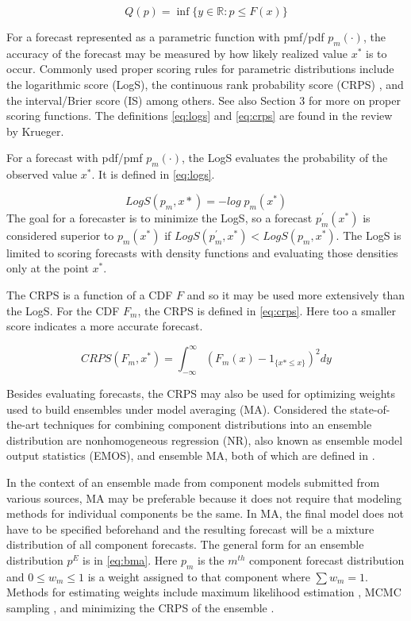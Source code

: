 \documentclass[11pt,notitlepage]{isuthesis}
\begin{document}
\begin{equation}
\label{eq:quant}
  Q(p) = \inf \{ y \in \mathbb{R} : p \leq F(x) \}
\end{equation}



For a forecast represented as a parametric function with pmf/pdf $p_m(\cdot)$, 
the accuracy of the forecast may be measured by how likely realized value $x^*$
is to occur. Commonly used proper scoring rules for parametric distributions
include the logarithmic score (LogS), the
continuous rank probability score (CRPS) \cite[]{hersbach2000decomposition}
\cite[]{alves2013ncep}, and the interval/Brier 
score (IS) \cite[]{gneiting2007strictly} among 
others. See also \cite[]{gneiting2014probabilistic}
Section 3 for more on proper scoring functions. The definitions 
\eqref{eq:logs} and \eqref{eq:crps} are found in the review by Krueger.

For a forecast with pdf/pmf $p_m(\cdot)$, the LogS evaluates the 
probability of the observed value $x^*$. It is defined in \eqref{eq:logs}.

\begin{equation}
\label{eq:logs}
  LogS(p_m,x*) = -log\;p_m(x^*)
\end{equation}
The goal for a forecaster is to minimize the LogS, so a forecast $p^{'}_m(x^*)$ 
is considered 
superior to $p_m(x^*)$ if
$LogS(p^{'}_m, x^*) < LogS(p_m, x^*)$.
The LogS is limited to scoring forecasts with density functions and
evaluating those densities only at the point $x^*$.

The CRPS is a function of a CDF $F$
and so it may
be used more extensively than the LogS. 
For the CDF $F_m$, the CRPS is defined in \eqref{eq:crps}.
Here too a smaller score indicates a more accurate forecast.

\begin{equation}
\label{eq:crps}
  CRPS(F_m, x^*) = \int_{-\infty}^{\infty} (F_m(x)- 1_{\{x*\leq x\}})^2 dy
\end{equation}


Besides evaluating forecasts, the CRPS may also be used for optimizing weights 
used
to build ensembles under model averaging (MA). Considered the 
state-of-the-art techniques for combining 
component distributions
into an ensemble distribution are nonhomogeneous regression (NR), also known as
ensemble model output statistics (EMOS), and ensemble
MA, both of which are defined in \cite[]{gneiting2014probabilistic}.

In the context of an ensemble made from component models submitted from various
sources,
MA may be preferable because it does not require that modeling methods for 
individual components be the same. 
In MA, the final model does not have to be specified
beforehand and the resulting forecast will be a mixture distribution
of all component forecasts. The general form for an ensemble distribution $p^E$
is in \eqref{eq:bma}. Here $p_m$ is the $m^{th}$ component forecast 
distribution and 
$0 \leq w_m \leq 1$ is a weight assigned to that component where $\sum w_m = 1$.
Methods for estimating weights include maximum likelihood estimation
\cite[]{raftery2005using}, MCMC 
sampling \cite[]{vrugt2008ensemble},
and minimizing the CRPS of the ensemble
\cite[]{baran2018combining}.
\end{document}

